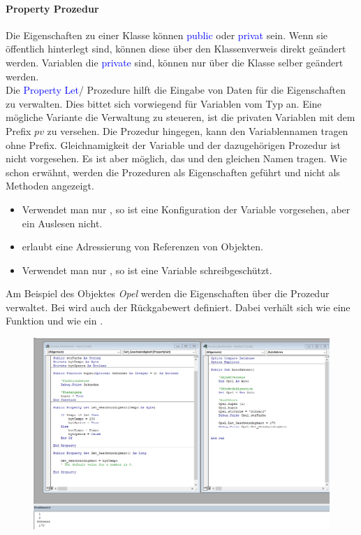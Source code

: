 \paragraph{Property Prozedur}
Die Eigenschaften zu einer Klasse können \textcolor{blue}{public} oder \textcolor{blue}{privat} sein. Wenn sie öffentlich hinterlegt sind, können diese über den Klassenverweis direkt geändert werden. Variablen die \textcolor{blue}{private} sind, können nur über die Klasse selber geändert werden.\\
Die \textcolor{blue}{Property Let}/  Prozedure hilft die Eingabe von Daten für die Eigenschaften zu verwalten. Dies bittet sich vorwiegend für Variablen vom Typ  an. Eine mögliche Variante die Verwaltung zu steueren, ist die privaten Variablen mit dem Prefix $pv$ zu versehen. Die Prozedur hingegen, kann den Variablennamen tragen ohne Prefix. Gleichnamigkeit der Variable und der dazugehörigen Prozedur ist nicht vorgesehen. Es ist aber möglich, das  und  den gleichen Namen tragen.   
Wie schon erwähnt, werden die Prozeduren als Eigenschaften geführt und nicht als Methoden angezeigt.
\begin{itemize}
	\item Verwendet man nur , so ist eine Konfiguration der Variable vorgesehen, aber ein Auslesen nicht.
	\item {} erlaubt eine Adressierung von Referenzen von Objekten.
	\item Verwendet man nur , so ist eine  Variable schreibgeschützt. 
\end{itemize}
Am Beispiel des Objektes \textit{Opel} werden die Eigenschaften über die  Prozedur verwaltet. Bei  wird auch der Rückgabewert definiert. Dabei verhält sich  wie eine Funktion und  wie ein .
\begin{figure}[H]
	\centering
	\includegraphics[scale = 0.3]{attachment/chapter_2/Scc033}
	\caption{}
	\label{fig:Scc033}
\end{figure} 


